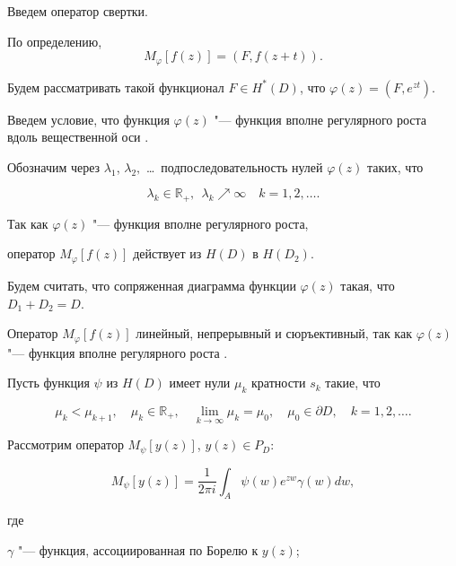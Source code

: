 \smallskip



Введем оператор свертки. 

По определению, $$M_\varphi[f(z)]=(F,f(z+t)).$$ 

Будем рассматривать такой функционал $F\in H^*(D)$, что $\varphi(z) =(F, e^{zt})$. 

Введем условие, что функция $\varphi(z)$ "--- функция вполне регулярного роста вдоль вещественной оси \cite[c.~182]{zabirova1}. 

Обозначим через $\lambda_1$, $\lambda_2,$ \dots\ подпоследовательность нулей $\varphi(z)$ таких, что 

\begin{equation}

 \label{nap:z:eq1.4}

\lambda_k\in \mathbb R_+,\, \; \lambda_k \nearrow \infty \quad k=1, 2, \dots .

\end{equation}

Так как $\varphi(z)$ "--- функция вполне регулярного роста, 

оператор $M_\varphi[f(z)]$ действует из $H(D)$ в $H(D_2)$. 

Будем считать, что сопряженная диаграмма функции $\varphi(z)$ такая, что $D_1+D_2 =D$. 

Оператор $M_\varphi[f(z)]$ линейный, непрерывный и сюръективный, так как $\varphi(z)$ "--- функция вполне регулярного роста \cite{zabirova2}.

 

Пусть функция $\psi$ из $H(D)$ имеет нули $\mu_k$ кратности $s_k$ такие, что 

\begin{equation}

 \label{nap:z:eq1.3}

\mu_{k}<\mu_{k+1}, \quad \mu_k\in \mathbb R_+, \quad\lim\limits_{k\rightarrow \infty} \mu_k=\mu_0, \quad \mu_0 \in \partial D, \quad k=1, 2, \dots .

\end{equation}

Рассмотрим оператор \cite{zabirova4} $M_{\psi}[y(z)]$, $ y(z)\in P_D$: 

$$

M_{\psi}[y(z)]=\frac {1}{2\pi i}\int_{A}{\psi(w) e^{zw}\gamma(w)dw},

$$ 

где %

$\gamma $ "--- функция, ассоциированная по Борелю к $y(z)$; 

